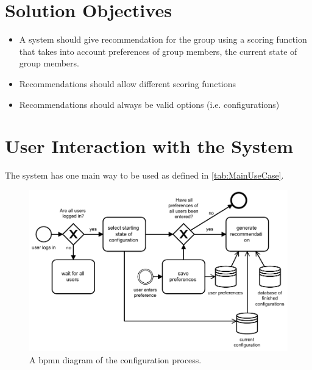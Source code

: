\documentclass{article}
\begin{document}
\section{Solution Objectives}

\begin{itemize}
    \item A system should give recommendation for the group using a scoring function that takes into account preferences of group members, the current state of group members.
    \item Recommendations should allow different scoring functions
    \item Recommendations should always be valid options (i.e. configurations)
\end{itemize}

\section{User Interaction with the System}
The system has one main way to be used as defined in \autoref{tab:MainUseCase}.

\begin{figure}
    \centering
    \includegraphics[width=1\textwidth]{./figures/bpmn_configuration_process_with_continious_recommendation.pdf}
    \caption{A bpmn diagram of the configuration process.}
    \label{fig:ConfigurationProcess}
\end{figure}
\end{document}
